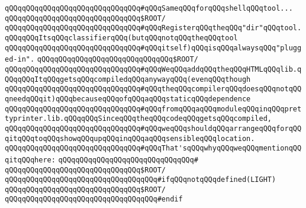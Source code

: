 \newline
\verb|qQQqqQQqqQQqqQQqqQQqqQQqqQQqqQQq#qQQqSameqQQqforqQQqshellqQQqtool...|\newline
\verb|qQQqqQQqqQQqqQQqqQQqqQQqqQQqqQQq$ROOT/|\newline
\newline
\verb|qQQqqQQqqQQqqQQqqQQqqQQqqQQqqQQq#qQQqRegisterqQQqtheqQQq"dir"qQQqtool.qQQqqQQqItsqQQqclassifierqQQq(butqQQqnotqQQqtheqQQqtool|\newline
\verb|qQQqqQQqqQQqqQQqqQQqqQQqqQQqqQQq#qQQqitself)qQQqisqQQqalwaysqQQq"plugged-in".|\newline
\verb|qQQqqQQqqQQqqQQqqQQqqQQqqQQqqQQq$ROOT/|\newline
\newline
\verb|qQQqqQQqqQQqqQQqqQQqqQQqqQQqqQQq#qQQqWeqQQqaddqQQqtheqQQqHTMLqQQqlib.qQQqqQQqItqQQqgetsqQQqcompiledqQQqanywayqQQq(evenqQQqthough|\newline
\verb|qQQqqQQqqQQqqQQqqQQqqQQqqQQqqQQq#qQQqtheqQQqcompilerqQQqdoesqQQqnotqQQqneedqQQqit)qQQqbecauseqQQqofqQQqaqQQqstaticqQQqdependence|\newline
\verb|qQQqqQQqqQQqqQQqqQQqqQQqqQQqqQQq#qQQqfromqQQqaqQQqmoduleqQQqinqQQqprettyprinter.lib.qQQqqQQqSinceqQQqtheqQQqcodeqQQqgetsqQQqcompiled,|\newline
\verb|qQQqqQQqqQQqqQQqqQQqqQQqqQQqqQQq#qQQqweqQQqshouldqQQqarrangeqQQqforqQQqitqQQqtoqQQqshowqQQqupqQQqinqQQqaqQQqsensibleqQQqlocation.|\newline
\verb|qQQqqQQqqQQqqQQqqQQqqQQqqQQqqQQq#qQQqThat'sqQQqwhyqQQqweqQQqmentionqQQqitqQQqhere:|\newline
\verb|qQQqqQQqqQQqqQQqqQQqqQQqqQQqqQQq#|\newline
\verb|qQQqqQQqqQQqqQQqqQQqqQQqqQQqqQQq$ROOT/|\newline
\newline
\verb|qQQqqQQqqQQqqQQqqQQqqQQqqQQqqQQqqQQq#ifqQQqnotqQQqdefined(LIGHT)|\newline
\verb|qQQqqQQqqQQqqQQqqQQqqQQqqQQqqQQq$ROOT/|\newline
\verb|qQQqqQQqqQQqqQQqqQQqqQQqqQQqqQQqqQQq#endif|\newline
